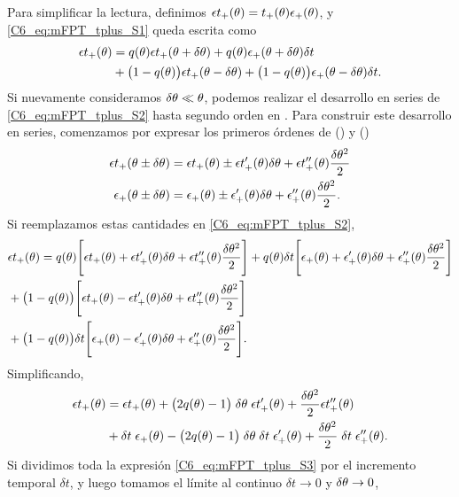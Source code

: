 \documentclass[./main.tex]{subfiles}
\begin{document}
Para simplificar la lectura, definimos  $\epsilon t_+(\theta) =  t_{+}(\theta) \epsilon_{+}(\theta)$, y \ref{C6_eq:mFPT_tplus_S1} queda escrita como
\begin{align}
   \epsilon t_+(\theta) & = q(\theta) \epsilon t_+(\theta + \delta\theta) + q(\theta) \epsilon_{+}(\theta + \delta\theta) \delta t \nonumber \\ & + \big( 1 - q(\theta) \big) \epsilon t_+(\theta - \delta\theta) +  \big( 1 - q(\theta) \big) \epsilon_{+}(\theta - \delta\theta) \delta t.
   \label{C6_eq:mFPT_tplus_S2}
\end{align}
Si nuevamente consideramos $\delta\theta \ll \theta$, podemos realizar el desarrollo en series de \ref{C6_eq:mFPT_tplus_S2} hasta segundo orden en \deltax. Para construir este desarrollo en series, comenzamos por expresar los primeros órdenes de \epstplus(\xx) y \epsplus(\xx) 
\begin{align}
    \epsilon t_+(\theta \pm \delta\theta) & = \epsilon t_+(\theta) \pm \epsilon t_+'(\theta) \delta\theta + \epsilon t_+''(\theta) \frac{\delta\theta^2}{2} \\
    \epsilon_{+}(\theta \pm \delta\theta) & = \epsilon_{+}(\theta) \pm \epsilon_{+}'(\theta) \delta\theta + \epsilon_{+}''(\theta) \frac{\delta\theta^2}{2}.
\end{align}
Si reemplazamos estas cantidades en \ref{C6_eq:mFPT_tplus_S2},
\begin{align}
       & \epsilon t_+(\theta) = q(\theta) \Bigg[  \epsilon t_+(\theta) + \epsilon t_+'(\theta) \delta\theta + \epsilon t_+''(\theta) \frac{\delta\theta^2}{2} \Bigg] + q(\theta) \delta t \Bigg[  \epsilon_{+}(\theta) + \epsilon_{+}'(\theta) \delta\theta + \epsilon_{+}''(\theta) \frac{\delta\theta^2}{2}\Bigg] \nonumber \\ & +  \big( 1 - q(\theta) \big) \Bigg[  \epsilon t_+(\theta) - \epsilon t_+'(\theta) \delta\theta + \epsilon t_+''(\theta) \frac{\delta\theta^2}{2} \Bigg] \nonumber \\ & + \big( 1 - q(\theta) \big) \delta t \Bigg[  \epsilon_{+}(\theta) - \epsilon_{+}'(\theta) \delta\theta + \epsilon_{+}''(\theta) \frac{\delta\theta^2}{2}\Bigg] .
\end{align}
Simplificando,
\begin{align}
        \epsilon t_+(\theta) & = \epsilon t_+(\theta) + \big(2 q(\theta) -1 \big) \; \delta\theta \;  \epsilon t_+'(\theta)  +  \frac{\delta\theta^2}{2}  \epsilon t_+''(\theta) \nonumber \\ & + \delta t \; \epsilon_{+}(\theta)  - \big(2 q(\theta) -1 \big) \; \delta\theta \; \delta t \;  \epsilon_{+}'(\theta) +  \frac{\delta\theta^2}{2} \; \delta t \; \epsilon_{+}''(\theta) .
        \label{C6_eq:mFPT_tplus_S3}
\end{align}
Si dividimos toda la expresión \ref{C6_eq:mFPT_tplus_S3} por el incremento temporal $\delta t$, y luego tomamos el límite al continuo  $\delta t \rightarrow   0 $ y $\delta\theta \rightarrow 0$, 
\end{document}
